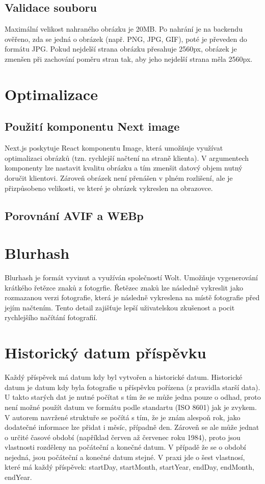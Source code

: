 \documentclass[12pt, a4paper,
 twoside,        %
 openright
]{report}
\begin{document}
\subsection{Validace souboru} Maximální velikost nahraného obrázku je 20MB.  Po nahrání je na backendu ověřeno, zda se jedná o obrázek (např. PNG, JPG, GIF), poté je převeden do formátu JPG. Pokud nejdelší strana obrázku přesahuje 2560px, obrázek je zmenšen při zachování poměru stran tak, aby jeho nejdelší strana měla 2560px. 
\section{Optimalizace}
\subsection{Použití komponentu Next image}
Next.js poskytuje React komponentu Image, která umožňuje využívat optimalizaci obrázků (tzn. rychlejší načtení na straně klienta). V argumentech komponenty lze nastavit kvalitu obrázku a tím zmenšit datový objem nutný doručit klientovi. Zároveň obrázek není přenášen v plném rozlišení, ale je přizpůsobeno velikosti, ve které je obrázek vykreslen na obrazovce. 
\subsection{Porovnání AVIF a WEBp}
\section{Blurhash}
Blurhash je formát vyvinut a využíván společností Wolt. Umožňuje vygenerování krátkého řetězce znaků z fotogrfie. Řetězec znaků lze následně vykreslit jako rozmazanou verzi fotografie, která je následně vykreslena na místě fotografie před jejím načtením. Tento detail zajišťuje lepší uživatelskou zkušenost a pocit rychlejšího načítání fotografií.



\section{Historický datum příspěvku}\label{section:historica_date}
Každý příspěvek má datum kdy byl vytvořen a historické datum. Historické datum je datum kdy byla fotografie u příspěvku pořízena (z pravidla starší data). U takto starých dat je nutné počítat s tím že se může jedna pouze o odhad, proto není možné použít datum ve formátu podle standartu (ISO 8601) jak je zvykem. V autorem navržené struktuře se počítá s tím, že je znám alespoň rok, jako dodatečné informace lze přidat i měsíc, případně den. Zároveň se ale může jednat o určité časové období (například červen až červenec roku 1984), proto jsou vlastnosti rozděleny na počáteční a konečné datum. V případě že se o období nejedná, jsou počáteční a konečné datum stejné. V praxi jde o šest vlastnosí, které má každý příspěvek: startDay, startMonth, startYear, endDay, endMonth, endYear.
\end{document}
